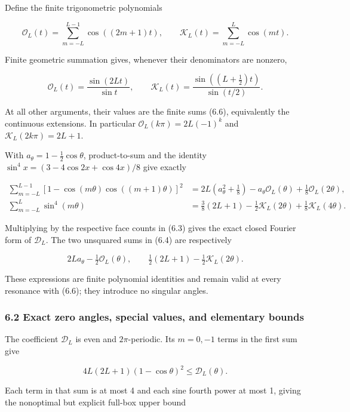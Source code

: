 \documentclass[
  11pt,
]{article}
\begin{document}
Define the finite trigonometric polynomials

\[
\mathcal O_L(t)=\sum_{m=-L}^{L-1}\cos((2m+1)t),\qquad
\mathcal K_L(t)=\sum_{m=-L}^{L}\cos(mt).
\tag{6.6}
\]

Finite geometric summation gives, whenever their denominators are
nonzero,

\[
\mathcal O_L(t)=\frac{\sin(2Lt)}{\sin t},\qquad
\mathcal K_L(t)=\frac{\sin((L+\tfrac12)t)}{\sin(t/2)}.
\tag{6.7}
\]

At all other arguments, their values are the finite sums (6.6),
equivalently the continuous extensions. In particular
\(\mathcal O_L(k\pi)=2L(-1)^k\) and \(\mathcal K_L(2k\pi)=2L+1\).

With \(a_\theta=1-\tfrac12\cos\theta\), product-to-sum and the identity
\(\sin^4x=(3-4\cos2x+\cos4x)/8\) give exactly

\[
\begin{split}
\sum_{m=-L}^{L-1}[1-\cos(m\theta)\cos((m+1)\theta)]^2
&=2L(a_\theta^2+\tfrac18)-a_\theta\mathcal O_L(\theta)
+\tfrac18\mathcal O_L(2\theta),\\
\sum_{m=-L}^{L}\sin^4(m\theta)
&=\tfrac38(2L+1)-\tfrac12\mathcal K_L(2\theta)
+\tfrac18\mathcal K_L(4\theta).
\end{split}
\tag{6.8}
\]

Multiplying by the respective face counts in (6.3) gives the exact
closed Fourier form of \(\mathcal D_L\). The two unsquared sums in (6.4)
are respectively

\[
2La_\theta-\tfrac12\mathcal O_L(\theta),\qquad
\tfrac12(2L+1)-\tfrac12\mathcal K_L(2\theta).
\tag{6.9}
\]

These expressions are finite polynomial identities and remain valid at
every resonance with (6.6); they introduce no singular angles.

\subsubsection{6.2 Exact zero angles, special values, and elementary
bounds}\label{magnetic-part-2-exact-zero-angles-special-values-and-elementary-bounds}

The coefficient \(\mathcal D_L\) is even and \(2\pi\)-periodic. Its
\(m=0,-1\) terms in the first sum give

\[
4L(2L+1)(1-\cos\theta)^2\le\mathcal D_L(\theta).
\tag{6.10}
\]

Each term in that sum is at most 4 and each sine fourth power at most 1,
giving the nonoptimal but explicit full-box upper bound
\end{document}
